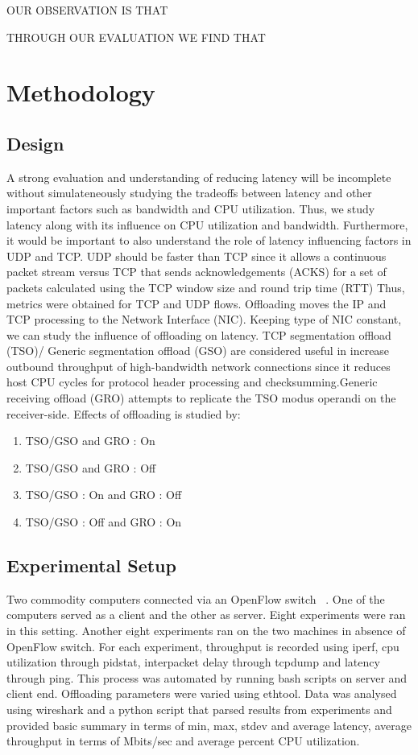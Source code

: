 OUR OBSERVATION IS THAT

THROUGH OUR EVALUATION WE FIND THAT

\section{Methodology}
\subsection{Design}
A strong evaluation and understanding of reducing latency will be incomplete
without simulateneously studying the tradeoffs between latency and other
important factors such as bandwidth and CPU utilization. Thus, we study latency
along with its influence on CPU utilization and bandwidth. Furthermore, it would be 
important to also understand the role of latency influencing factors in UDP and
TCP. UDP should be faster than TCP since it allows a continuous packet stream
versus TCP that sends acknowledgements (ACKS) for a set of packets calculated
using the TCP window size and round trip time (RTT) Thus, metrics were obtained
for TCP and UDP flows.  Offloading moves the IP and TCP processing to the
Network Interface (NIC).  Keeping type of NIC constant, we can study the
influence of offloading on latency. TCP segmentation offload (TSO)/ Generic
segmentation offload (GSO) are considered useful in increase outbound
throughput of high-bandwidth network connections since it reduces host CPU cycles
for protocol header processing and checksumming.Generic receiving offload (GRO)
    attempts to replicate the TSO modus operandi on the receiver-side. Effects
    of offloading is studied by:

\begin{enumerate} 
\item TSO/GSO and GRO : On 
\item TSO/GSO and GRO : Off 
\item TSO/GSO : On and GRO : Off 
\item TSO/GSO : Off and GRO : On 
\end{enumerate} 

\subsection{Experimental Setup} 
Two commodity computers connected via an OpenFlow switch ~\cite{openflow}. One
of the computers served as a client and the other as server. Eight experiments
were ran in this setting. Another eight experiments ran on the two machines in
absence of OpenFlow switch. For each experiment, throughput is recorded using
iperf, cpu utilization through pidstat, interpacket delay through tcpdump and
latency through ping. This process was automated by running bash scripts on
server and client end. Offloading parameters were varied using ethtool. Data was
analysed using wireshark and a python script that parsed results from
experiments and provided basic summary in terms of min, max, stdev and average latency, 
average throughput in terms of Mbits/sec and average percent CPU utilization.
